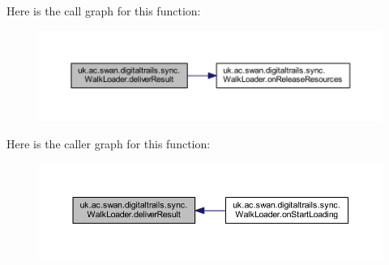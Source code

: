 Here is the call graph for this function\+:\nopagebreak
\begin{figure}[H]
\begin{center}
\leavevmode
\includegraphics[width=350pt]{classuk_1_1ac_1_1swan_1_1digitaltrails_1_1sync_1_1_walk_loader_a8587e0e55cac69b0ea2b7c0e247c560a_cgraph}
\end{center}
\end{figure}




Here is the caller graph for this function\+:\nopagebreak
\begin{figure}[H]
\begin{center}
\leavevmode
\includegraphics[width=350pt]{classuk_1_1ac_1_1swan_1_1digitaltrails_1_1sync_1_1_walk_loader_a8587e0e55cac69b0ea2b7c0e247c560a_icgraph}
\end{center}
\end{figure}


